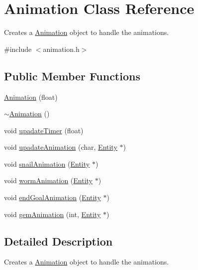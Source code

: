 \hypertarget{class_animation}{\section{Animation Class Reference}
\label{class_animation}
}


Creates a \hyperlink{class_animation}{Animation} object to handle the animations.  




{\ttfamily \#include $<$animation.\+h$>$}

\subsection*{Public Member Functions}
\begin{DoxyCompactItemize}
\item 
\hyperlink{class_animation_a3937169e447959e16931cf95ea0bea42}{Animation} (float)
\item 
\hyperlink{class_animation_a401b68793d4fbf48d481c030ee4b2a16}{$\sim$\+Animation} ()
\item 
void \hyperlink{class_animation_aa1b39bd3c7b83eea908d6e15896206ca}{upadate\+Timer} (float)
\item 
void \hyperlink{class_animation_a46ac949b21a0aed488953ee0a47ec35f}{upadate\+Animation} (char, \hyperlink{class_entity}{Entity} $\ast$)
\item 
void \hyperlink{class_animation_a64378ac8df319e785e93e8e2ff9b4f7d}{snail\+Animation} (\hyperlink{class_entity}{Entity} $\ast$)
\item 
void \hyperlink{class_animation_a28698eae748a6bcac0bbbafb1c62f32b}{worm\+Animation} (\hyperlink{class_entity}{Entity} $\ast$)
\item 
void \hyperlink{class_animation_aa991142b70b9d07bde2a2b4a934fae16}{end\+Goal\+Animation} (\hyperlink{class_entity}{Entity} $\ast$)
\item 
void \hyperlink{class_animation_a988b1ced0cf9d9a64ed3fb0891e3c563}{gem\+Animation} (int, \hyperlink{class_entity}{Entity} $\ast$)
\end{DoxyCompactItemize}


\subsection{Detailed Description}
Creates a \hyperlink{class_animation}{Animation} object to handle the animations. 

